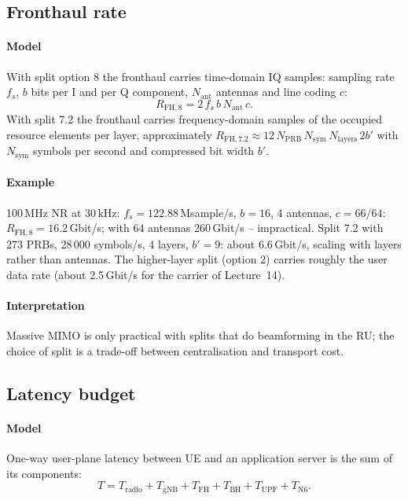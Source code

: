 \documentclass[11pt,a4paper]{article}
\begin{document}
\subsection{Fronthaul rate}\label{sec:fh}
\paragraph{Model} With split option 8 the fronthaul carries time-domain IQ samples: sampling rate $f_s$, $b$ bits per I and per Q component, $N_{\mathrm{ant}}$
antennas and line coding $c$:
\begin{equation}\label{eq:cpri}
  R_{\mathrm{FH},8} = 2\, f_s\, b\, N_{\mathrm{ant}}\, c .
\end{equation}
With split 7.2 the fronthaul carries frequency-domain samples of the occupied resource elements per layer, approximately
$R_{\mathrm{FH},7.2} \approx 12\,N_{\mathrm{PRB}}\,N_{\mathrm{sym}}\,N_{\mathrm{layers}}\,2b'$ with $N_{\mathrm{sym}}$ symbols per second and compressed bit width $b'$.
\paragraph{Example} 100\,MHz NR at 30\,kHz: $f_s = 122.88$\,Msample/s, $b = 16$, 4 antennas, $c = 66/64$: $R_{\mathrm{FH},8} = 16.2$\,Gbit/s; with 64
antennas 260\,Gbit/s -- impractical. Split 7.2 with 273 PRBs, 28\,000 symbols/s, 4 layers, $b' = 9$: about 6.6\,Gbit/s, scaling with layers rather than
antennas. The higher-layer split (option 2) carries roughly the user data rate (about 2.5\,Gbit/s for the carrier of Lecture~14).
\paragraph{Interpretation} Massive MIMO is only practical with splits that do beamforming in the RU; the choice of split is a trade-off between
centralisation and transport cost.

\subsection{Latency budget}\label{sec:budget}
\paragraph{Model} One-way user-plane latency between UE and an application server is the sum of its components:
\begin{equation}\label{eq:budget}
  T = T_{\mathrm{radio}} + T_{\mathrm{gNB}} + T_{\mathrm{FH}} + T_{\mathrm{BH}} + T_{\mathrm{UPF}} + T_{\mathrm{N6}} .
\end{equation}
\end{document}
